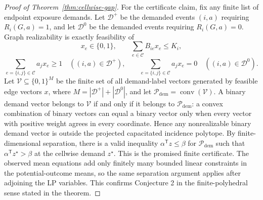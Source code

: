 \documentclass[11pt]{article}
\newcommand{\transpose}{\mathsf{T}}
\theoremstyle{definition}
\theoremstyle{plain}
\theoremstyle{remark}
\begin{document}
\begin{proof}[Proof of Theorem~\ref{thm:cellwise-gap}]
For the certificate claim, fix any finite list of endpoint exposure demands.
Let \(\mathcal D^+\) be the demanded events \((i,a)\) requiring
\(R_i(G,a)=1\), and let \(\mathcal D^0\) be the demanded events requiring
\(R_i(G,a)=0\).  Graph realizability is exactly feasibility of
\[
x_e\in\{0,1\},\qquad
\sum_{e\in\mathcal C}B_{ie}x_e\le K_i,
\]
\[
\sum_{e=\{i,j\}\in\mathcal C}a_jx_e\ge1
\quad ((i,a)\in\mathcal D^+),
\qquad
\sum_{e=\{i,j\}\in\mathcal C}a_jx_e=0
\quad ((i,a)\in\mathcal D^0).
\]
Let \(\mathcal V\subseteq\{0,1\}^M\) be the finite set of all demand-label
vectors generated by feasible edge vectors \(x\), where \(M=|\mathcal D^+|+
|\mathcal D^0|\), and let \(\mathcal P_{\mathrm{dem}}=\operatorname{conv}
(\mathcal V)\).  A binary demand vector belongs to \(\mathcal V\) if and only if
it belongs to \(\mathcal P_{\mathrm{dem}}\): a convex combination of binary
vectors can equal a binary vector only when every vector with positive weight
agrees in every coordinate.  Hence any nonrealizable binary demand vector is
outside the projected capacitated incidence polytope.  By finite-dimensional
separation, there is a valid inequality \(\alpha^\transpose z\le\beta\) for
\(\mathcal P_{\mathrm{dem}}\) such that \(\alpha^\transpose z^\star>\beta\) at
the cellwise demand \(z^\star\).  This is the promised finite certificate.  The
observed mean equations add only finitely many bounded linear constraints in the
potential-outcome means, so the same separation argument applies after adjoining
the LP variables.  This confirms Conjecture 2 in the finite-polyhedral sense
stated in the theorem.
\end{proof}
\end{document}
